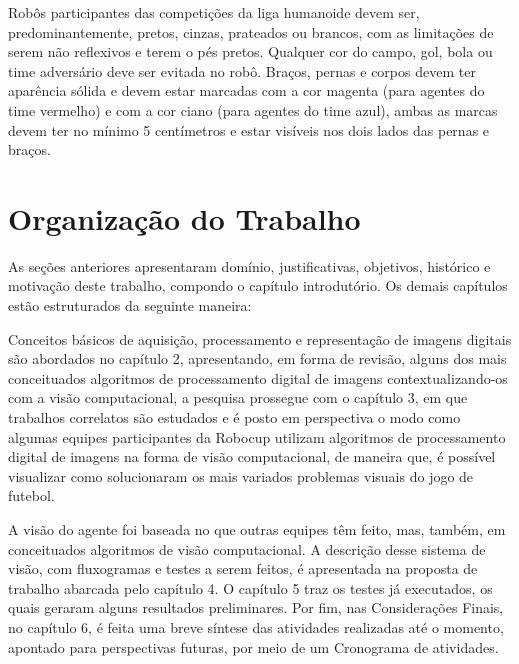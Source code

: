 Robôs participantes das competições da liga humanoide devem ser, predominantemente, pretos, cinzas, prateados ou brancos, com as limitações de serem não reflexivos e terem o pés pretos. Qualquer cor do campo, gol, bola ou time adversário deve ser evitada no robô. Braços, pernas e corpos devem ter aparência sólida e devem estar marcadas com a cor magenta (para agentes do time vermelho) e com a cor ciano (para agentes do time azul), ambas as marcas devem ter no mínimo 5 centímetros e estar visíveis nos dois lados das pernas e braços.

\section{Organização do Trabalho}

As seções anteriores apresentaram domínio, justificativas, objetivos, histórico e motivação deste trabalho, compondo o capítulo introdutório. Os demais capítulos estão estruturados da seguinte maneira:

Conceitos básicos de aquisição, processamento e representação de imagens digitais são abordados no capítulo 2, apresentando, em forma de revisão, alguns dos mais conceituados algoritmos de processamento digital de imagens contextualizando-os com a visão computacional, a pesquisa prossegue com o capítulo 3, em que trabalhos correlatos são estudados e é posto em perspectiva o modo como algumas equipes participantes da Robocup utilizam algoritmos de processamento digital de imagens na forma de visão computacional, de maneira que, é possível visualizar como solucionaram os mais variados problemas visuais do jogo de futebol.

A visão do agente foi baseada no que outras equipes têm feito, mas, também, em conceituados algoritmos de visão computacional. A descrição desse sistema de visão, com fluxogramas e testes a serem feitos, é apresentada na proposta de trabalho abarcada pelo capítulo 4. O capítulo 5 traz os testes já executados, os quais geraram alguns resultados preliminares. Por fim, nas Considerações Finais, no capítulo 6, é feita uma breve síntese das atividades realizadas até o momento, apontado para perspectivas futuras, por meio de um Cronograma de atividades.

